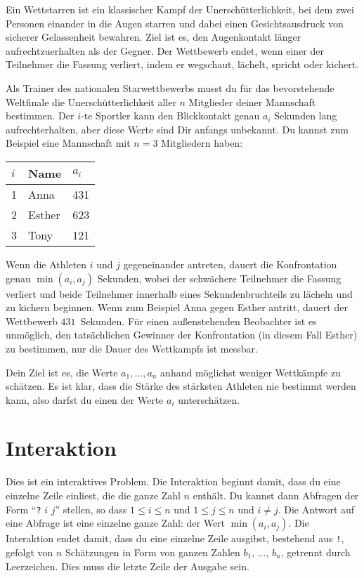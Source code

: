 

\noindent
Ein Wettstarren ist ein klassischer Kampf der Unerschütterlichkeit, bei dem zwei Personen einander in die Augen starren und dabei einen Gesichtsausdruck von sicherer Gelassenheit bewahren.
Ziel ist es, den Augenkontakt länger aufrechtzuerhalten als der Gegner.
Der Wettbewerb endet, wenn einer der Teilnehmer die Fassung verliert, indem er wegschaut, lächelt, spricht oder kichert.

Als Trainer des nationalen Starwettbewerbs musst du für das bevorstehende Weltfinale die Unerschütterlichkeit aller $n$ Mitglieder deiner Mannschaft bestimmen.
Der $i$-te Sportler kann den Blickkontakt genau $a_i$ Sekunden lang aufrechterhalten, aber diese Werte sind Dir anfangs unbekannt.
Du kannst zum Beispiel eine Mannschaft mit $n=3$ Mitgliedern haben:

\medskip
\begin{tabular}{lll}
  $i$ & Name & $a_i$\\\hline
  1 & Anna &  431 \\
  2 & Esther & 623 \\
  3 & Tony &  121\\
\end{tabular}

\medskip
Wenn die Athleten $i$ und $j$ gegeneinander antreten, dauert die Konfrontation genau $\min(a_i, a_j)$ Sekunden, wobei der schwächere Teilnehmer die Fassung verliert und beide Teilnehmer innerhalb eines Sekundenbruchteils zu lächeln und zu kichern beginnen.
Wenn zum Beispiel Anna gegen Esther antritt, dauert der Wettbewerb $431$~Sekunden.
Für einen außenstehenden Beobachter ist es unmöglich, den tatsächlichen Gewinner der Konfrontation (in diesem Fall Esther) zu bestimmen, nur die Dauer des Wettkampfs ist messbar.

Dein Ziel ist es, die Werte $a_1,\ldots, a_n$ anhand möglichst weniger Wettkämpfe zu schätzen.
Es ist klar, dass die Stärke des stärksten Athleten nie bestimmt werden kann, also darfst du einen der Werte $a_i$ unterschätzen.

\section*{Interaktion}

Dies ist ein interaktives Problem.
Die Interaktion beginnt damit, dass du eine einzelne Zeile einliest, die die ganze Zahl $n$ enthält.
Du kannst dann Abfragen der Form ``\texttt{?} $i$ $j$'' stellen, so dass $1\leq i\leq n$ und $1\leq j\leq n$ und $i\neq j$.
Die Antwort auf eine Abfrage ist eine einzelne ganze Zahl: der Wert $\min(a_i, a_j)$.
Die Interaktion endet damit, dass du eine einzelne Zeile ausgibst, bestehend aus \texttt{!}, gefolgt von $n$ Schätzungen in Form von ganzen Zahlen $b_1$, $\ldots$, $b_n$, getrennt durch Leerzeichen.
Dies muss die letzte Zeile der Ausgabe sein.

